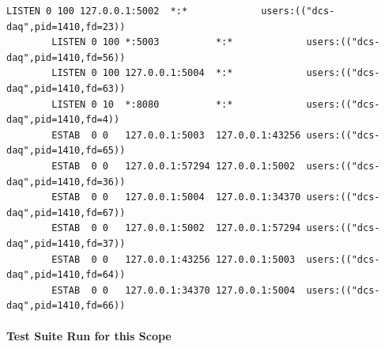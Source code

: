       \begin{lstlisting}[caption={Socket Status During Network Test},
                         label={lst:test-rest-net-ss}]
        LISTEN 0 100 127.0.0.1:5002  *:*             users:(("dcs-daq",pid=1410,fd=23))
        LISTEN 0 100 *:5003          *:*             users:(("dcs-daq",pid=1410,fd=56))
        LISTEN 0 100 127.0.0.1:5004  *:*             users:(("dcs-daq",pid=1410,fd=63))
        LISTEN 0 10  *:8080          *:*             users:(("dcs-daq",pid=1410,fd=4))
        ESTAB  0 0   127.0.0.1:5003  127.0.0.1:43256 users:(("dcs-daq",pid=1410,fd=65))
        ESTAB  0 0   127.0.0.1:57294 127.0.0.1:5002  users:(("dcs-daq",pid=1410,fd=36))
        ESTAB  0 0   127.0.0.1:5004  127.0.0.1:34370 users:(("dcs-daq",pid=1410,fd=67))
        ESTAB  0 0   127.0.0.1:5002  127.0.0.1:57294 users:(("dcs-daq",pid=1410,fd=37))
        ESTAB  0 0   127.0.0.1:43256 127.0.0.1:5003  users:(("dcs-daq",pid=1410,fd=64))
        ESTAB  0 0   127.0.0.1:34370 127.0.0.1:5004  users:(("dcs-daq",pid=1410,fd=66))
      \end{lstlisting}

      \paragraph{Test Suite Run for this Scope}\mbox{}\\

